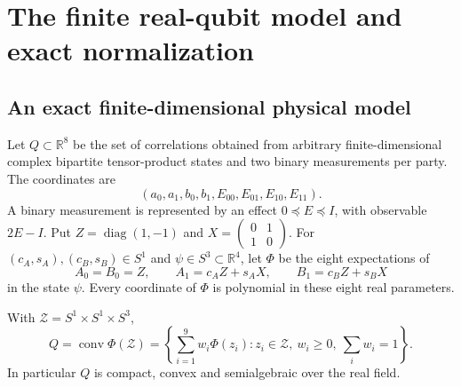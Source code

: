 \chapter{The finite real-qubit model and exact normalization}
\label{ch:model}
\label{component:p9b00698ff36a}
\label{p9b00698ff36a:sec:fresh-r21-conditional-assembly}
\section{An exact finite-dimensional physical model}

Let $Q\subset\mathbb R^8$ be the set of correlations obtained from arbitrary
finite-dimensional complex bipartite tensor-product states and two binary
measurements per party. The coordinates are
\[
 (a_0,a_1,b_0,b_1,E_{00},E_{01},E_{10},E_{11}).
 \tag{RFA1}
\]
A binary measurement is represented by an effect $0\preceq E\preceq I$,
with observable $2E-I$. Put
$Z=\operatorname{diag}(1,-1)$ and
$X=\left(\begin{smallmatrix}0&1\\1&0\end{smallmatrix}\right)$.
For $(c_A,s_A),(c_B,s_B)\in S^1$ and $\psi\in S^3\subset\mathbb R^4$,
let $\Phi$ be the eight expectations of
\[
 A_0=B_0=Z,\qquad A_1=c_AZ+s_AX,\qquad B_1=c_BZ+s_BX
 \tag{RFA2}
\]
in the state $\psi$. Every coordinate of $\Phi$ is polynomial in these
eight real parameters.

\begin{theorem}
With $\mathcal Z=S^1\times S^1\times S^3$,
\[
 Q=\operatorname{conv}\Phi(\mathcal Z)
   =\left\{\sum_{i=1}^{9}w_i\Phi(z_i):
       z_i\in\mathcal Z,\ w_i\geq0,\ \sum_iw_i=1\right\}.
 \tag{RFA3}
\]
In particular $Q$ is compact, convex and semialgebraic over the real field.
\end{theorem}

